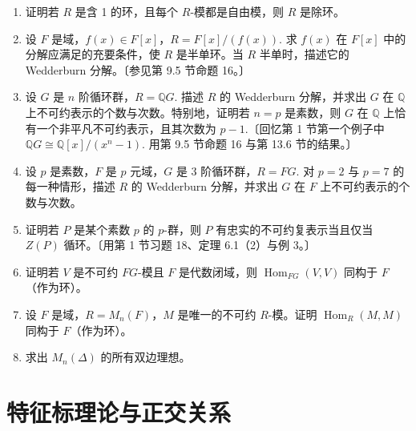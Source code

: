 \begin{enumerate}
（a）证明 \(\Delta \cong \operatorname{Hom}_S(L, L)\)，其中 \(L\) 是 \(S\) 的极小左理想。推出 \(\Delta \cong \Delta'\).〔用命题 6（4）。〕

（b）证明除环 \(\Delta\) 上的有限生成（左）模有「基」（线性无关的生成集），且任意两组基有相同基数。推出 \(n = n'\).〔模仿第 11.1 节推论 4（2）的证明。〕

\item 证明若 \(R\) 是含 1 的环，且每个 \(R\)-模都是自由模，则 \(R\) 是除环。

\item 设 \(F\) 是域，\(f(x) \in F[x]\)，\(R = F[x]/(f(x))\). 求 \(f(x)\) 在 \(F[x]\) 中的分解应满足的充要条件，使 \(R\) 是半单环。当 \(R\) 半单时，描述它的 Wedderburn 分解。〔参见第 9.5 节命题 16。〕

\item 设 \(G\) 是 \(n\) 阶循环群，\(R = \mathbb{Q}G\). 描述 \(R\) 的 Wedderburn 分解，并求出 \(G\) 在 \(\mathbb{Q}\) 上不可约表示的个数与次数。特别地，证明若 \(n = p\) 是素数，则 \(G\) 在 \(\mathbb{Q}\) 上恰有一个非平凡不可约表示，且其次数为 \(p-1\).〔回忆第 1 节第一个例子中 \(\mathbb{Q}G \cong \mathbb{Q}[x]/(x^n-1)\). 用第 9.5 节命题 16 与第 13.6 节的结果。〕

\item 设 \(p\) 是素数，\(F\) 是 \(p\) 元域，\(G\) 是 3 阶循环群，\(R = FG\). 对 \(p = 2\) 与 \(p = 7\) 的每一种情形，描述 \(R\) 的 Wedderburn 分解，并求出 \(G\) 在 \(F\) 上不可约表示的个数与次数。

\item 证明若 \(P\) 是某个素数 \(p\) 的 \(p\)-群，则 \(P\) 有忠实的不可约复表示当且仅当 \(Z(P)\) 循环。〔用第 1 节习题 18、定理 6.1（2）与例 3。〕

\item 证明若 \(V\) 是不可约 \(FG\)-模且 \(F\) 是代数闭域，则 \(\operatorname{Hom}_{FG}(V, V)\) 同构于 \(F\)（作为环）。

\item 设 \(F\) 是域，\(R = M_n(F)\)，\(M\) 是唯一的不可约 \(R\)-模。证明 \(\operatorname{Hom}_R(M, M)\) 同构于 \(F\)（作为环）。

\item 求出 \(M_n(\Delta)\) 的所有双边理想。
\end{enumerate}

\section{特征标理论与正交关系}

